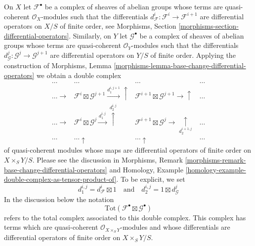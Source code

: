 \medskip\noindent
On $X$ let $\mathcal{F}^\bullet$ be a complex of sheaves of abelian groups
whose terms are quasi-coherent $\mathcal{O}_X$-modules
such that the differentials
$d^i_\mathcal{F} : \mathcal{F}^i \to \mathcal{F}^{i + 1}$
are differential operators on $X/S$ of finite order, see
Morphisms, Section \ref{morphisms-section-differential-operators}.
Similarly, on $Y$ let $\mathcal{G}^\bullet$ be a complex of sheaves
of abelian groups whose terms are quasi-coherent $\mathcal{O}_Y$-modules
such that the differentials
$d^j_\mathcal{G} : \mathcal{G}^j \to \mathcal{G}^{j + 1}$
are differential operators on $Y/S$ of finite order.
Applying the construction of
Morphisms, Lemma \ref{morphisms-lemma-base-change-differential-operators}
we obtain a double complex
$$
\begin{array}{cccc}\ldots & \ldots & \ldots & \ldots \\ \ldots \longrightarrow & \mathcal{F}^i \boxtimes \mathcal{G}^{j + 1}
\overset{d_1^{i, j + 1}}{\longrightarrow}\uparrow & \mathcal{F}^{i + 1} \boxtimes \mathcal{G}^{j + 1} \longrightarrow\uparrow & \ldots \\ \ldots \longrightarrow & \mathcal{F}^i \boxtimes \mathcal{G}^j
\overset{d_1^{i, j}}{\longrightarrow}\overset{d_2^{i, j}}{\uparrow} & \mathcal{F}^{i + 1} \boxtimes \mathcal{G}^j \longrightarrow\underset{d_2^{i + 1, j}}{\uparrow} & \ldots \\ \ldots & \ldots \uparrow & \ldots \uparrow & \ldots\end{array}
$$
of quasi-coherent modules whose maps are differential operators of
finite order on $X \times_S Y / S$. Please see the discussion in
Morphisms, Remark \ref{morphisms-remark-base-change-differential-operators}
and
Homology, Example \ref{homology-example-double-complex-as-tensor-product-of}.
To be explicit, we set
$$
d_1^{i, j} = d^i_\mathcal{F} \boxtimes 1
\quad\text{and}\quad
d_2^{i, j} = 1 \boxtimes d^j_\mathcal{G}
$$
In the discussion below the notation
$$
\text{Tot}(\mathcal{F}^\bullet \boxtimes \mathcal{G}^\bullet)
$$
refers to the total complex associated to this double complex.
This complex has terms which are quasi-coherent
$\mathcal{O}_{X \times_S Y}$-modules and whose differentials
are differential operators of finite order on $X \times_S Y / S$.

